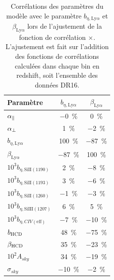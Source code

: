 \documentclass[11pt, twoside, a4paper, openright]{report}
\begin{document}
\begin{table}[]
  \centering
  \caption{Corrélations des paramètres du modèle avec le paramètre $b_{\eta,\mathrm{Ly}\alpha}$ et $\beta_{\mathrm{Ly}\alpha}$ lors de l'ajustement de la fonction de corrélation \lya{}$\times$\lya{}. L'ajustement est fait sur l'addition des fonctions de corrélations calculées dans chaque bin en redshift, soit l'ensemble des données DR16.}
  \label{tab:corr_bias_lya}
  \begin{tabular}{lcc}
    \toprule
    Paramètre  & $b_{\eta,\mathrm{Ly}\alpha}$ & $\beta_{\mathrm{Ly}\alpha}$ \\
    \midrule
    $\alpha_{\parallel}{} $ & \SI{-0}{\percent} & \SI{0}{\percent}\\
    $\alpha_{\perp}{} $ & \SI{1}{\percent} & \SI{-2}{\percent} \\
    $b_{\eta, \mathrm{Ly}\alpha} $ & \SI{100}{\percent} & \SI{-87}{\percent} \\
    $\beta_{\mathrm{Ly}\alpha} $ & \SI{-87}{\percent} &  \SI{100}{\percent} \\
    $10^3 b_{\eta, \mathrm{SiII}(1190)} $ & \SI{2}{\percent} & \SI{-8}{\percent} \\
    $10^3 b_{\eta, \mathrm{SiII}(1193)} $ & \SI{3}{\percent} & \SI{-6}{\percent} \\
    $10^3 b_{\eta, \mathrm{SiII}(1260)} $ & \SI{-1}{\percent} & \SI{-3}{\percent} \\
    $10^3 b_{\eta, \mathrm{SiIII}(1207)} $ & \SI{6}{\percent} & \SI{5}{\percent}\\
    $10^3 b_{\eta, CIV(\mathrm{eff})} $ &\SI{-7}{\percent} & \SI{-10}{\percent}\\
    $b_{\textsc{HCD}} $ & \SI{48}{\percent} & \SI{-75}{\percent}\\
    $\beta_{\textsc{HCD}} $ & \SI{35}{\percent} & \SI{-23}{\percent}\\
    $10^2 A_{sky} $ & \SI{34}{\percent} & \SI{-19}{\percent}\\
    $\sigma_{sky} $ & \SI{-10}{\percent} & \SI{-2}{\percent}\\
    \bottomrule
\end{tabular}
\end{table}
\end{document}
